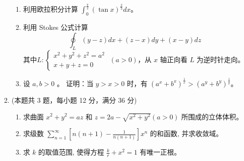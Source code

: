 \begin{enumerate}
\begin{enumerate}
	
	\item
	利用欧拉积分计算 $\int_{0}^{\frac{\pi}{2}}(\tan x)^{\frac{2}{3}} d x$。
	
	
	



\item
利用 Stokes 公式计算
\[ 
\oint_{L}(y-z) d x+(z-x) d y+(x-y) d z
 \]
 其中$L:\left\{\begin{array}{l}x^{2}+y^{2}+z^{2}=a^{2} \\ x+y+z=0\end{array}\right.$ $ (a>0) $，从 $x$ 轴正向看 $L$ 为逆时针走向。


\item
 设 $a, b>0$ 。 证明：当 $y>x>0$ 时，有 $\left(a^{x}+b^{x}\right)^{\frac{1}{x}}>\left(a^{y}+b^{y}\right)^{\frac{1}{y}}$。

\end{enumerate}




\item 
(本题共 3 题，每小题 12 分，满分 36 分)
\begin{enumerate}
	\item
求曲面 $x^{2}+y^{2}=a z$ 和 $z=2 a-\sqrt{x^{2}+y^{2}}(a>0)$ 所围成的立体体积。
	
	
	\item
	求级数 $\sum\limits_{n=1}^{\infty}\left[n(n+1)-\frac{1}{n(n+1)}\right] x^{n}$ 的和函数, 并求收敛域。
	
	
	\item
	求 $k$ 的取值范围, 使得方程 $\frac{k}{r}+x^{2}=1$ 有唯一正根。
	

\end{enumerate}
\end{enumerate}
